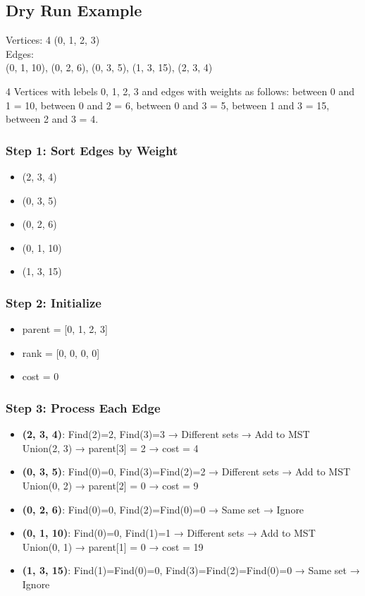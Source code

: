 \documentclass[14pt,a4paper]{extarticle}
\begin{document}
\subsection*{Dry Run Example}

\begin{tcolorbox}[title=Graph Details]
Vertices: 4 (0, 1, 2, 3)\\
Edges:\\
(0, 1, 10), (0, 2, 6), (0, 3, 5), (1, 3, 15), (2, 3, 4)
\end{tcolorbox}
4 Vertices with lebels 0, 1, 2, 3 and edges with weights as follows:
between 0 and 1 = 10, between 0 and 2 = 6, between 0 and 3 = 5, between 1 and 3 = 15, between 2 and 3 = 4.
\subsubsection*{Step 1: Sort Edges by Weight}
\begin{itemize}
    \item (2, 3, 4)
    \item (0, 3, 5)
    \item (0, 2, 6)
    \item (0, 1, 10)
    \item (1, 3, 15)
\end{itemize}

\subsubsection*{Step 2: Initialize}
\begin{itemize}
    \item parent = [0, 1, 2, 3]
    \item rank = [0, 0, 0, 0]
    \item cost = 0
\end{itemize}

\subsubsection*{Step 3: Process Each Edge}
\begin{itemize}
    \item \textbf{(2, 3, 4)}: Find(2)=2, Find(3)=3 → Different sets → Add to MST\\
    \quad Union(2, 3) → parent[3] = 2 → cost = 4

    \item \textbf{(0, 3, 5)}: Find(0)=0, Find(3)=Find(2)=2 → Different sets → Add to MST\\
    \quad Union(0, 2) → parent[2] = 0 → cost = 9

    \item \textbf{(0, 2, 6)}: Find(0)=0, Find(2)=Find(0)=0 → Same set → Ignore

    \item \textbf{(0, 1, 10)}: Find(0)=0, Find(1)=1 → Different sets → Add to MST\\
    \quad Union(0, 1) → parent[1] = 0 → cost = 19

    \item \textbf{(1, 3, 15)}: Find(1)=Find(0)=0, Find(3)=Find(2)=Find(0)=0 → Same set → Ignore
\end{itemize}
\end{document}
